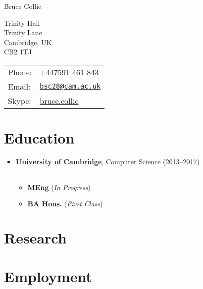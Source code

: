 \documentclass[letterpaper]{article}
\def\name{Bruce Collie}
\begin{document}
{\huge \name}


\vspace{0.25in}

\begin{minipage}{0.45\linewidth}
  Trinity Hall \\
  Trinity Lane \\
  Cambridge, UK \\
  CB2 1TJ
\end{minipage}
\begin{minipage}{0.45\linewidth}
  \begin{tabular}{ll}
    Phone: & +447591 461 843 \\
    Email: & \href{mailto:bsc28@cam.ac.uk}{\tt bsc28@cam.ac.uk} \\
    Skype: & \href{skype:bruce.collie}{bruce.collie}
  \end{tabular}
\end{minipage}

\section*{Education}

\begin{itemize}
  \item \textbf{University of Cambridge}, Computer Science (2013--2017)
        \begin{tabular}{c}
        \end{tabular}
        \begin{itemize}
            \item \textbf{MEng} (\emph{In Progress})
            \item \textbf{BA Hons.} (\emph{First Class})
        \end{itemize}
\end{itemize}

\section*{Research}

\section*{Employment}
\end{document}

